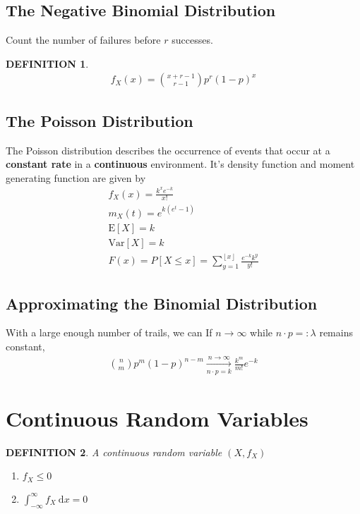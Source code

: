 \documentclass[11pt,a4paper]{article}
\newcommand{\dd}{\mathrm{d}}
\newcommand{\dx}{\dd x}
\newtheorem*{definition}{\bf DEFINITION}
\begin{document}
\subsection{The Negative Binomial Distribution}
Count the number of failures before $r$ successes.
\begin{definition}
    \begin{gather*}
        f_X(x)=\binom{x+r-1}{r-1}p^r(1-p)^x
    \end{gather*}
\end{definition}

\subsection{The Poisson Distribution}
The Poisson distribution describes the occurrence of events that occur
at a {\bf constant rate} in a {\bf continuous} environment.
It's density function and moment generating function are given by
\begin{gather*}
    f_X(x) = \frac{k^x e^{-k}}{x!} \\
    m_X  (t) = e^{k(e^t-1)}\\
    \mathrm{E}[X]=k\\
    \mathrm{Var}[X]=k\\
    F(x)=P[X\le x]=\sum_{y=1}^{\left\lfloor x \right\rfloor}\frac{e^{-k}k^y}{y!}
\end{gather*}

\subsection{Approximating the Binomial Distribution}
With a large enough number of trails, we can
If $n\rightarrow\infty$ while $n\cdot p=:\lambda$ remains constant,
\begin{gather*}
    \binom{n}{m}
    p^m(1-p)^{n-m}     \xrightarrow[n\cdot p =k]{n\rightarrow \infty} \frac{k^m}{m!}e^{-k}
\end{gather*}

\section{Continuous Random Variables}
\begin{definition}
    A continuous random variable $(X,f_X)$
    \begin{enumerate}
        \item $f_X\le0$
        \item $\int_{-\infty}^{\infty}f_X\ \dx = 0$
    \end{enumerate}
\end{definition}
\end{document}
